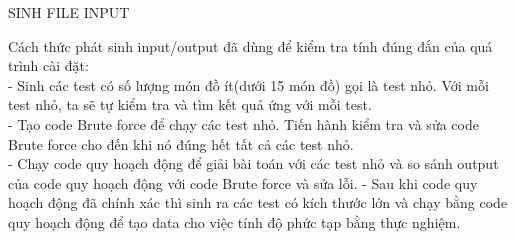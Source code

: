 \documentclass[10pt,a4paper]{article}
\begin{document}
\begin{center}
    \fontsize{30}{30}\selectfont
    SINH FILE INPUT
\end{center}

\begin{flushleft}
\fontsize{14}{20}\selectfont
Cách thức phát sinh input/output đã dùng để kiểm tra tính đúng đắn của quá trình cài đặt:\\
- Sinh các test có số lượng món đồ ít(dưới 15 món đồ) gọi là test nhỏ. Với mỗi test nhỏ, ta sẽ tự kiểm tra và tìm kết quả ứng với mỗi test.\\
- Tạo code Brute force để chạy các test nhỏ. Tiến hành kiểm tra và sửa code Brute force cho đến khi nó đúng hết tất cả các test nhỏ.\\
- Chạy code quy hoạch động để giải bài toán với các test nhỏ và so sánh output của code quy hoạch động với code Brute force và sửa lỗi.
- Sau khi code quy hoạch động đã chính xác thì sinh ra các test có kích thước lớn và chạy bằng code quy hoạch động để tạo data cho việc tính độ phức tạp bằng thực nghiệm.
\end{flushleft}
\end{document}
